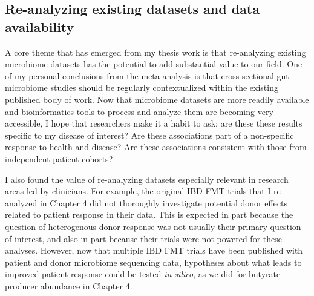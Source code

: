 


\subsection{Re-analyzing existing datasets and data availability}

A core theme that has emerged from my thesis work is that re-analyzing existing microbiome datasets has the potential to add substantial value to our field.
One of my personal conclusions from the meta-analysis is that cross-sectional gut microbiome studies should be regularly contextualized within the existing published body of work.
Now that microbiome datasets are more readily available and bioinformatics tools to process and analyze them are becoming very accessible, I hope that researchers make it a habit to ask: are these these results specific to my disease of interest? Are these associations part of a non-specific response to health and disease? Are these associations consistent with those from independent patient cohorts?

I also found the value of re-analyzing datasets especially relevant in research areas led by clinicians.
For example, the original IBD FMT trials that I re-analyzed in Chapter 4 did not thoroughly investigate potential donor effects related to patient response in their data.
This is expected in part because the question of heterogenous donor response was not usually their primary question of interest, and also in part because their trials were not powered for these analyses.
However, now that multiple IBD FMT trials have been published with patient and donor microbiome sequencing data, hypotheses about what leads to improved patient response could be tested \textit{in silico}, as we did for butyrate producer abundance in Chapter 4.

